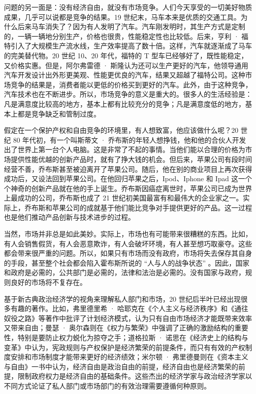 问题的另一面是：没有经济自由，就没有市场竞争。人们今天享受的一切美好物质成果，几乎可以说都是竞争的结果。19 世纪末，马车本来是优质的交通工具。为什么后来马车消失了？因为有人发明了汽车。汽车刚发明时，其生产方式是定制的，一辆一辆地分别生产，价格也很贵，性能稳定性也比较低。后来，亨利 · 福特引入了大规模生产流水线，生产效率提高了数十倍。这样，汽车就逐渐成了马车的完美替代物。20 世纪 10、20 年代，福特的 T 型车已经够好了，既性能稳定，又价格实惠。但是，阿尔弗雷德 · 斯隆认为还可以生产更好的汽车，他领导通用汽车开发设计出外形更美观、性能更优良的汽车，结果又超越了福特公司。这种市场竞争的结果是，消费者能以更低的价格买到更好的汽车。此外，由于这种竞争，汽车技术也在不断进步。所以，市场竞争的意义是重大的。很多人的生活经验是：凡是满意度比较高的地方，基本上都有比较充分的竞争；凡是满意度低的地方，基本上都是竞争缺乏和管制过度。

假定在一个保护产权和自由竞争的环境里，有人想致富，他应该做什么呢？20 世纪 80 年代初，有一个叫斯蒂文 · 乔布斯的年轻人想挣钱，他和他的合伙人开发出了世界上第一台个人电脑。这是非常了不起的事情。当他们能以合理的价格为市场提供性能优越的创新产品时，就有了挣大钱的机会。但后来，苹果公司有段时间经营不善，乔布斯甚至被迫离开了苹果公司。随后，他在别的商业项目上再次获得成功后，又设法回到苹果公司。在他回归苹果之后，Ipod、Iphone 和 Ipad 这一个个神奇的创新产品就在他的手上诞生。乔布斯因癌症离世时，苹果公司已成为世界上最成功的公司，乔布斯也成了 21 世纪初美国最富有和最伟大的企业家之一。实际上，乔布斯和苹果公司的成就基于他们能比竞争对手提供更好的产品。这一过程也是他们推动产品创新与技术进步的过程。

当然，市场并非总是如此美妙。实际上，市场也有可能带来很糟糕的东西。比如，有人会销售假货，有人会恶意欺诈，有人会破坏环境，有人甚至想巧取豪夺。这些都会带来很严重的问题。所以，如果只有市场而没有政府，市场将失去保存其自身的手段，甚至整个社会都会陷入霍布斯所说的 “人与人的战争状态” 。因此，国家和政府是必需的，公共部门是必需的，法律和法治是必需的。没有国家与政府，规则良好的市场将不复存在。

基于新古典政治经济学的视角来理解私人部门和市场，20 世纪后半叶已经出现很多有趣的著作。比如，弗里德里希 · 哈耶克在《个人主义与经济秩序》和《通往奴役之路》等著作中批评了计划经济模式，认为只有自由市场经济才能既带来效率又带来自由；曼瑟 · 奥尔森则在《权力与繁荣》中强调了正确的激励结构的重要性，特别是要防止权力蜕化为掠夺之手；道格拉斯 · 诺思在《经济史上的结构与变革》中认为，宪政规则与产权保护是经济繁荣的前提条件，而只有有效的产权制度安排和市场制度才能带来更好的经济绩效；米尔顿 · 弗里德曼则在《资本主义与自由》一书中认为，经济自由是政治自由的前提，经济自由也是经济繁荣的前提，限制政府权力是经济自由的基础条件。这些杰出的经济学家与政治经济学家以不同方式论证了私人部门或市场部门的有效治理需要遵循何种原则。


